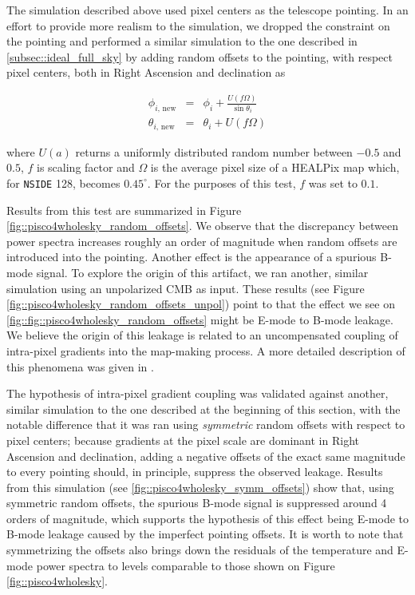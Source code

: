 \documentclass[a4paper,11pt]{article}
\begin{document}
The simulation described above used pixel centers as the telescope pointing. In an effort to provide more realism to the simulation, we dropped the constraint on the pointing and performed a similar simulation to the one described in \ref{subsec::ideal_full_sky} by adding random offsets to the pointing, with respect pixel centers, both in Right Ascension and declination as

\begin{eqnarray}
\phi_{i, \, \mathrm{new}} &=& \phi_{i} + \frac{ U( f \Omega ) }{ \sin{\theta_i} } \\
\theta_{i, \, \mathrm{new}} &=& \theta_{i} +  U(f\Omega)
\end{eqnarray}

\noindent
where $U(a)$ returns a uniformly distributed random number between $-0.5$ and $0.5$, $f$ is scaling factor and $\Omega$ is the average pixel size of a HEALPix map which, for \texttt{NSIDE} 128, becomes $0.45^\circ$. For the purposes of this test, $f$ was set to $0.1$. 

Results from this test are summarized in Figure \ref{fig::pisco4wholesky_random_offsets}. We observe that the discrepancy between power spectra increases roughly an order of magnitude when random offsets are introduced into the pointing. Another effect is the appearance of a spurious B-mode signal. To explore the origin of this artifact, we ran another, similar simulation using an unpolarized CMB as input. These results (see Figure \ref{fig::pisco4wholesky_random_offsets_unpol}) point to that the effect we see on \ref{fig::fig::pisco4wholesky_random_offsets} might be E-mode to B-mode leakage. We believe the origin of this leakage is related to an uncompensated coupling of intra-pixel gradients into the map-making process. A more detailed description of this phenomena was given in \cite{2005poutanen}. 

The hypothesis of intra-pixel gradient coupling was validated against another, similar simulation to the one described at the beginning of this section, with the notable difference that it was ran using \textsl{symmetric} random offsets with respect to pixel centers; because gradients at the pixel scale are dominant in Right Ascension and declination, adding a negative offsets of the exact same magnitude to every pointing should, in principle, suppress the observed leakage. Results from this simulation (see \ref{fig::pisco4wholesky_symm_offsets}) show that, using symmetric random offsets, the spurious B-mode signal is suppressed around 4 orders of magnitude, which supports the hypothesis of this effect being E-mode to B-mode leakage caused by the imperfect pointing offsets. It is worth to note that symmetrizing the offsets also brings down the residuals of the temperature and E-mode power spectra to levels comparable to those shown on Figure \ref{fig::pisco4wholesky}.
\end{document}
